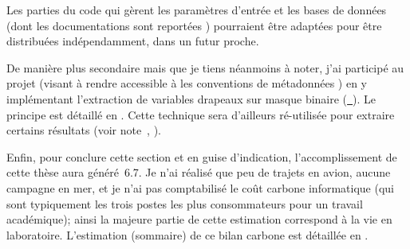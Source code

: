 Les parties du code qui gèrent les paramètres d'entrée et les bases de données (dont les documentations sont reportées ) pourraient être adaptées pour être distribuées indépendamment, dans un futur proche.

De manière plus secondaire mais que je tiens néanmoins à noter, j'ai participé au projet  (visant à rendre accessible à  les conventions de métadonnées ) en y implémentant l'extraction de variables drapeaux sur masque binaire (\href{https://github.com/xarray-contrib/cf-xarray/pull/354}{~}).
Le principe est détaillé en .
Cette technique sera d'ailleurs ré-utilisée pour extraire certains résultats (voir note~,  ).

\bigskip

Enfin, pour conclure cette section et en guise d'indication, l'accomplissement de cette thèse aura généré~\qty{6.7}{\tcarbone}.
Je n'ai réalisé que peu de trajets en avion, aucune campagne en mer, et je n'ai pas comptabilisé le coût carbone informatique (qui sont typiquement les trois postes les plus consommateurs pour un travail académique); ainsi la majeure partie de cette estimation correspond à la vie en laboratoire.
L'estimation (sommaire) de ce bilan carbone est détaillée en .
